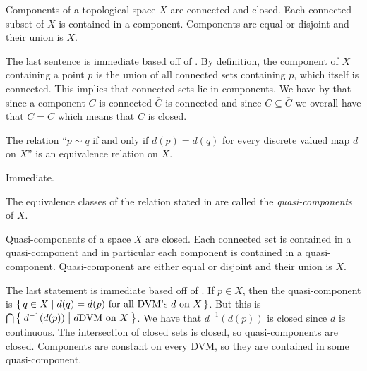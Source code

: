 \documentclass[letterpaper, 11pt, oneside]{book}
\begin{document}
\begin{prop}
  Components of a topological space $X$ are connected and closed.
  Each connected subset of $X$ is contained in a component.
  Components are equal or disjoint and their union is $X$.
\end{prop}
\begin{pf}
  The last sentence is immediate based off of .
  By definition, the component of $X$ containing a point $p$ is the union of all connected sets containing $p$, which itself is connected.
  This implies that connected sets lie in components.
  We have by  that since a component $C$ is connected $\overline{C}$ is connected and since $C \subseteq \overline{C}$ we overall have that $C = \overline{C}$ which means that $C$ is closed.
\end{pf}

\begin{prop}\label{prop: dvm_eq_rel}
  The relation ``$p \sim q$ if and only if $d(p) = d(q)$ for every discrete valued map $d$ on $X$'' is an equivalence relation on $X$.
\end{prop}
\begin{pf}
  Immediate.
\end{pf}

\begin{defn}
  The equivalence classes of the relation stated in  are called the \emph{quasi-components} of $X$.
\end{defn}

\clearpage

\begin{prop}
  Quasi-components of a space $X$ are closed.
  Each connected set is contained in a quasi-component and in particular each component is contained in a quasi-component.
  Quasi-component are either equal or disjoint and their union is $X$.
\end{prop}
\begin{pf}
  The last statement is immediate based off of .
  If $p \in X$, then the quasi-component is $\set{q \in X | d(q) = d(p) \text{ for all DVM's } d \text{ on } X}$.
  But this is $\bigcap \Set{d^{-1}(d(p)) | d \text{DVM on } X}$.
  We have that $d^{-1}(d(p))$ is closed since $d$ is continuous.
  The intersection of closed sets is closed, so quasi-components are closed.
  Components are constant on every DVM, so they are contained in some quasi-component.
\end{pf}
\end{document}
